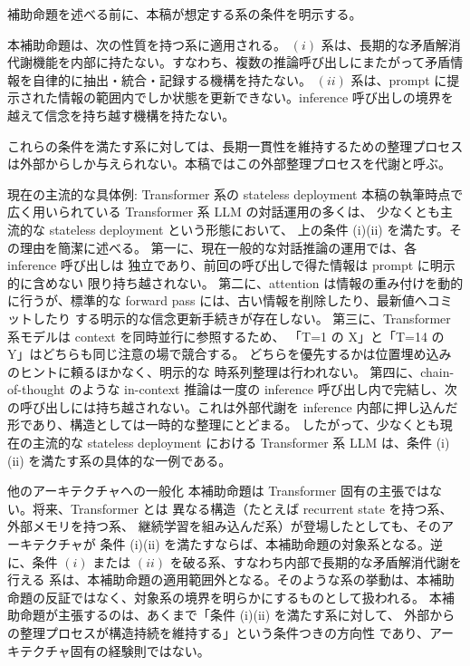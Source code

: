 \documentclass[12pt,a4paper]{article}
\begin{document}
補助命題を述べる前に、本稿が想定する系の条件を明示する。

\begin{assumption}[想定する系の条件]
本補助命題は、次の性質を持つ系に適用される。
$(i)$ 系は、長期的な矛盾解消代謝機能を内部に持たない。すなわち、複数の推論呼び出しにまたがって矛盾情報を自律的に抽出・統合・記録する機構を持たない。
$(ii)$ 系は、prompt に提示された情報の範囲内でしか状態を更新できない。inference 呼び出しの境界を越えて信念を持ち越す機構を持たない。
\end{assumption}

これらの条件を満たす系に対しては、長期一貫性を維持するための整理プロセスは外部からしか与えられない。本稿ではこの外部整理プロセスを代謝と呼ぶ。

現在の主流的な具体例: Transformer 系の stateless deployment 本稿の執筆時点で広く用いられている Transformer 系 LLM の対話運用の多くは、 少なくとも主流的な stateless deployment という形態において、 上の条件 (i)(ii) を満たす。その理由を簡潔に述べる。 第一に、現在一般的な対話推論の運用では、各 inference 呼び出しは 独立であり、前回の呼び出しで得た情報は prompt に明示的に含めない 限り持ち越されない。 第二に、attention は情報の重み付けを動的に行うが、標準的な forward pass には、古い情報を削除したり、最新値へコミットしたり する明示的な信念更新手続きが存在しない。 第三に、Transformer 系モデルは context を同時並行に参照するため、 「T=1 の X」と「T=14 の Y」はどちらも同じ注意の場で競合する。 どちらを優先するかは位置埋め込みのヒントに頼るほかなく、明示的な 時系列整理は行われない。 第四に、chain-of-thought のような in-context 推論は一度の inference 呼び出し内で完結し、次の呼び出しには持ち越されない。これは外部代謝を inference 内部に押し込んだ形であり、構造としては一時的な整理にとどまる。 したがって、少なくとも現在の主流的な stateless deployment における Transformer 系 LLM は、条件 (i)(ii) を満たす系の具体的な一例である。

他のアーキテクチャへの一般化 本補助命題は Transformer 固有の主張ではない。将来、Transformer とは 異なる構造（たとえば recurrent state を持つ系、外部メモリを持つ系、 継続学習を組み込んだ系）が登場したとしても、そのアーキテクチャが 条件 (i)(ii) を満たすならば、本補助命題の対象系となる。逆に、条件 \((i)\) または \((ii)\) を破る系、すなわち内部で長期的な矛盾解消代謝を行える 系は、本補助命題の適用範囲外となる。そのような系の挙動は、本補助 命題の反証ではなく、対象系の境界を明らかにするものとして扱われる。 本補助命題が主張するのは、あくまで「条件 (i)(ii) を満たす系に対して、 外部からの整理プロセスが構造持続を維持する」という条件つきの方向性 であり、アーキテクチャ固有の経験則ではない。
\end{document}
